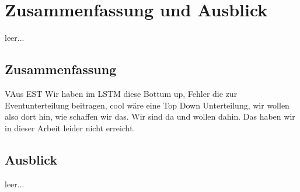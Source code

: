 \chapter{Zusammenfassung und Ausblick} 
\label{ch:ende}
leer...
\section{Zusammenfassung}
VAus EST Wir haben im LSTM diese Bottum up, Fehler die zur Eventunterteilung beitragen, cool wäre eine Top Down Unterteilung, wir wollen also dort hin, wie schaffen wir das. Wir sind da und wollen dahin. Das haben wir in dieser Arbeit leider nicht erreicht.

\section{Ausblick}
leer...